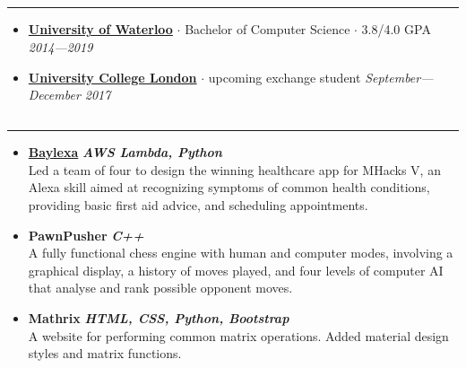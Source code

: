 \documentclass[7pt,letterpaper]{article}
\newcommand{\dt}{$\cdot$ }
\begin{document}
\subsection*{}
\hrule
\vspace{1.0em}
  \begin{itemize}
    \parskip=-0.5em
  \itemsep0.5em

    \item[]
      {\href{http://www.uwaterloo.ca}{\textbf{University of Waterloo}}} \dt
      Bachelor of Computer Science \dt 3.8/4.0 GPA \hfill \emph{2014---2019}
    \item[]
      {\href{https://www.ucl.ac.uk/}{\textbf{University College London}}} \dt upcoming exchange student
      \hfill \emph{September---December 2017}

  \end{itemize}

\subsection*{}
\hrule
\vspace{1.0em}
  \begin{itemize}
    \parskip=-0.5em
  \itemsep0.6em

    \item[]
      {\href{http://devpost.com/software/baylexa-fv149r}{\textbf{Baylexa}}}
      \hfill \textbf{\emph{AWS Lambda, Python}}
      \\
      Led a team of four to design the winning healthcare app for MHacks V, an
      Alexa skill aimed at recognizing symptoms of common health conditions,
      providing basic first aid advice, and scheduling appointments.
    \item[]
      \textbf{PawnPusher} \hfill \textbf{\emph{C++}}
      \\
      A fully functional chess engine with human and computer modes, involving a
      graphical display, a history of moves played, and four levels of computer
      AI that analyse and rank possible opponent moves.
    \item[]
      \textbf{Mathrix} \hfill \textbf{\emph{HTML, CSS, Python, Bootstrap}}
      \\
      A website for performing common matrix operations. Added material design
      styles and matrix functions.
  \end{itemize}

 
\end{document}
